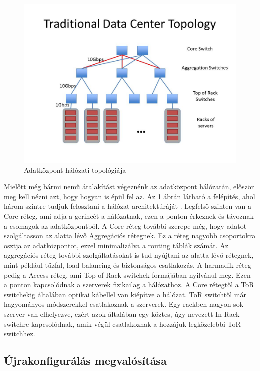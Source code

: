 \documentclass[12pt]{report}
\begin{document}
\begin{figure}[h]
	\centering
	\includegraphics[width=0.7\linewidth]{pictures/Traditional+Data+Center+Topology.jpg}
	\caption{Adatközpont hálózati topológiája}
	\label{datacenter_topology}
\end{figure}

Mielőtt még bármi nemű átalakítást végeznénk az adatközpont hálózatán, először meg kell nézni azt, hogy hogyan is épül fel az.
Az \ref{datacenter_topology} ábrán látható a felépítés, ahol három szintre tudjuk felosztani a hálózat architektúráját \cite{noauthor_you_nodate} \cite{noauthor_cisco_nodate}.
Legfelső szinten van a Core réteg, ami adja a gerincét a hálózatnak, ezen a ponton érkeznek és távoznak a csomagok az adatközpontból.
A Core réteg további szerepe még, hogy adatot szolgáltasson az alatta lévő Aggregációs rétegnek.
Ez a réteg nagyobb csoportokra osztja az adatközpontot, ezzel minimalizálva a routing táblák számát.
Az aggregációs réteg további szolgáltatásokat is tud nyújtani az alatta lévő rétegnek, mint például tűzfal, load balancing és biztonságos csatlakozás.
A harmadik réteg pedig a Access réteg, ami Top of Rack switchek formájában nyilvánul meg.
Ezen a ponton kapcsolódnak a szerverek fizikailag a hálózathoz.
A Core rétegtől a ToR switchekig általában optikai kábellel van kiépítve a hálózat. 
ToR switchtől már hagyományos módszerekkel csatlakoznak a szerverek.
Egy rackben nagyon sok szerver van elhelyezve, ezért azok általában egy köztes, úgy nevezett In-Rack switchre kapcsolódnak, amik végül csatlakoznak a hozzájuk legközelebbi ToR switchhez.



\subsection{Újrakonfigurálás megvalósítása}
\end{document}
